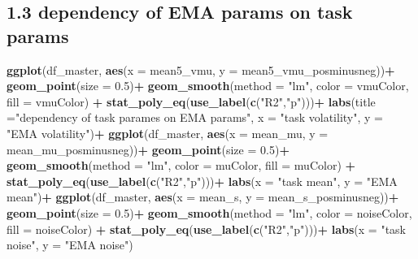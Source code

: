 \documentclass[
]{article}
\newenvironment{Shaded}{\begin{snugshade}}{\end{snugshade}}
\newcommand{\AttributeTok}[1]{\textcolor[rgb]{0.13,0.29,0.53}{#1}}
\newcommand{\FloatTok}[1]{\textcolor[rgb]{0.00,0.00,0.81}{#1}}
\newcommand{\FunctionTok}[1]{\textcolor[rgb]{0.13,0.29,0.53}{\textbf{#1}}}
\newcommand{\NormalTok}[1]{#1}
\newcommand{\SpecialCharTok}[1]{\textcolor[rgb]{0.81,0.36,0.00}{\textbf{#1}}}
\newcommand{\StringTok}[1]{\textcolor[rgb]{0.31,0.60,0.02}{#1}}
\begin{document}
\hypertarget{dependency-of-ema-params-on-task-params}{%
\subsection{1.3 dependency of EMA params on task
params}\label{dependency-of-ema-params-on-task-params}}

\begin{Shaded}
\begin{Highlighting}[]
\FunctionTok{ggplot}\NormalTok{(df\_master, }\FunctionTok{aes}\NormalTok{(}\AttributeTok{x =}\NormalTok{ mean5\_vmu, }\AttributeTok{y =}\NormalTok{ mean5\_vmu\_posminusneg))}\SpecialCharTok{+}
  \FunctionTok{geom\_point}\NormalTok{(}\AttributeTok{size =} \FloatTok{0.5}\NormalTok{)}\SpecialCharTok{+}
  \FunctionTok{geom\_smooth}\NormalTok{(}\AttributeTok{method =} \StringTok{"lm"}\NormalTok{, }\AttributeTok{color =}\NormalTok{ vmuColor, }\AttributeTok{fill =}\NormalTok{ vmuColor) }\SpecialCharTok{+}
  \FunctionTok{stat\_poly\_eq}\NormalTok{(}\FunctionTok{use\_label}\NormalTok{(}\FunctionTok{c}\NormalTok{(}\StringTok{"R2"}\NormalTok{,}\StringTok{"p"}\NormalTok{)))}\SpecialCharTok{+}
  \FunctionTok{labs}\NormalTok{(}\AttributeTok{title =}\StringTok{"dependency of task parames on EMA params"}\NormalTok{,}
       \AttributeTok{x =} \StringTok{"task volatility"}\NormalTok{,}
       \AttributeTok{y =} \StringTok{"EMA volatility"}\NormalTok{)}\SpecialCharTok{+}
\FunctionTok{ggplot}\NormalTok{(df\_master, }\FunctionTok{aes}\NormalTok{(}\AttributeTok{x =}\NormalTok{ mean\_mu, }\AttributeTok{y =}\NormalTok{ mean\_mu\_posminusneg))}\SpecialCharTok{+}
  \FunctionTok{geom\_point}\NormalTok{(}\AttributeTok{size =} \FloatTok{0.5}\NormalTok{)}\SpecialCharTok{+}
  \FunctionTok{geom\_smooth}\NormalTok{(}\AttributeTok{method =} \StringTok{"lm"}\NormalTok{, }\AttributeTok{color =}\NormalTok{ muColor, }\AttributeTok{fill =}\NormalTok{ muColor) }\SpecialCharTok{+}
  \FunctionTok{stat\_poly\_eq}\NormalTok{(}\FunctionTok{use\_label}\NormalTok{(}\FunctionTok{c}\NormalTok{(}\StringTok{"R2"}\NormalTok{,}\StringTok{"p"}\NormalTok{)))}\SpecialCharTok{+}
  \FunctionTok{labs}\NormalTok{(}\AttributeTok{x =} \StringTok{"task mean"}\NormalTok{,}
       \AttributeTok{y =} \StringTok{"EMA mean"}\NormalTok{)}\SpecialCharTok{+}
\FunctionTok{ggplot}\NormalTok{(df\_master, }\FunctionTok{aes}\NormalTok{(}\AttributeTok{x =}\NormalTok{ mean\_s, }\AttributeTok{y =}\NormalTok{ mean\_s\_posminusneg))}\SpecialCharTok{+}
  \FunctionTok{geom\_point}\NormalTok{(}\AttributeTok{size =} \FloatTok{0.5}\NormalTok{)}\SpecialCharTok{+}
  \FunctionTok{geom\_smooth}\NormalTok{(}\AttributeTok{method =} \StringTok{"lm"}\NormalTok{, }\AttributeTok{color =}\NormalTok{ noiseColor, }\AttributeTok{fill =}\NormalTok{ noiseColor) }\SpecialCharTok{+}
  \FunctionTok{stat\_poly\_eq}\NormalTok{(}\FunctionTok{use\_label}\NormalTok{(}\FunctionTok{c}\NormalTok{(}\StringTok{"R2"}\NormalTok{,}\StringTok{"p"}\NormalTok{)))}\SpecialCharTok{+}
  \FunctionTok{labs}\NormalTok{(}\AttributeTok{x =} \StringTok{"task noise"}\NormalTok{,}
       \AttributeTok{y =} \StringTok{"EMA noise"}\NormalTok{)}
\end{Highlighting}
\end{Shaded}
\end{document}
